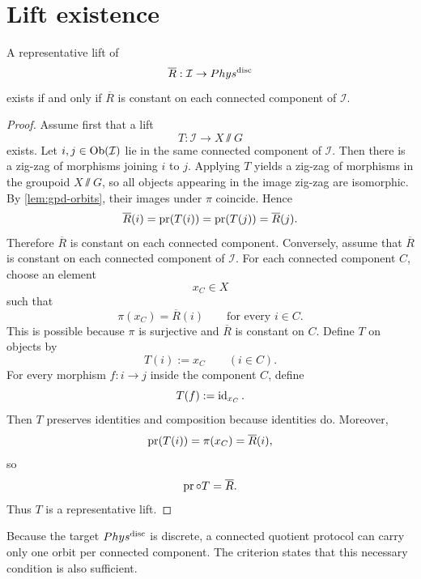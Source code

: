 \section{Lift existence}
\begin{lemma}
	A representative lift of
	\[
		\overline R:\mathcal I\to Phys^{\mathrm{disc}}
	\]
	exists if and only if \(\overline R\) is constant on each connected
	component of \(\mathcal I\).
\end{lemma}
\begin{proof}
	Assume first that a lift
	\[
		T:\mathcal I\to X\sslash G
	\]
	exists.
	Let \(i,j\in \operatorname{Ob}(\mathcal I)\) lie in the same connected component of
	\(\mathcal I\).  Then there is a zig-zag of morphisms joining \(i\) to
	\(j\).  Applying \(T\) yields a zig-zag of morphisms in the groupoid
	\(X\sslash G\), so all objects appearing in the image zig-zag are
	isomorphic.  By \cref{lem:gpd-orbits}, their images under \(\pi\)
	coincide.  Hence
	\[
		\overline R(i)
		=
		\operatorname{pr}(T(i))
		=
		\operatorname{pr}(T(j))
		=
		\overline R(j).
	\]
	Therefore \(\overline R\) is constant on each connected component.
	Conversely, assume that \(\overline R\) is constant on each connected
	component of \(\mathcal I\).  For each connected component \(C\), choose
	an element
	\[
		x_C\in X
	\]
	such that
	\[
		\pi(x_C)=\overline R(i)
		\qquad
		\text{for every }i\in C.
	\]
	This is possible because \(\pi\) is surjective and \(\overline R\) is
	constant on \(C\).
	Define \(T\) on objects by
	\[
		T(i):=x_C
		\qquad
		(i\in C).
	\]
	For every morphism \(f:i\to j\) inside the component \(C\), define
	\[
		T(f):=\operatorname{id}_{x_C}.
	\]
	Then \(T\) preserves identities and composition because identities do.
	Moreover,
	\[
		\operatorname{pr}(T(i))=\pi(x_C)=\overline R(i),
	\]
	so
	\[
		\operatorname{pr}\circ T=\overline R.
	\]
	Thus \(T\) is a representative lift.
\end{proof}
\begin{remark}
	Because the target \(Phys^{\mathrm{disc}}\) is discrete, a connected quotient
	protocol can carry only one orbit per connected component.  The
	criterion states that this necessary condition is also
	sufficient.
\end{remark}
